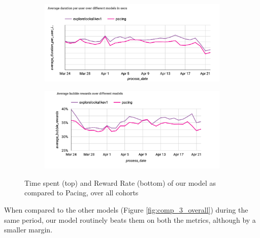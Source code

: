 \begin{figure}
    \centering
    \begin{subfigure}
      \centering
      \includegraphics[width=\linewidth]{figures/DurationOverall-wrtPacing.png}
    \end{subfigure}%
    \begin{subfigure}
      \centering
      \includegraphics[width=\linewidth]{figures/BubRewardOverall-wrtPacing.png}
    \end{subfigure}
    \caption{Time spent (top) and Reward Rate (bottom) of our model as compared to Pacing, over all cohorts}
    \label{fig:comp_pacing_overall}
\end{figure}

When compared to the other models (Figure \ref{fig:comp_3_overall}) during the same period, our model routinely beats them on both the metrics, although by a smaller margin.  

